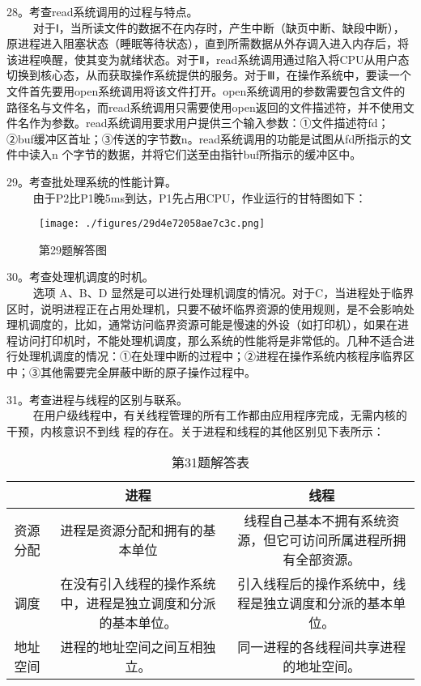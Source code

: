 28。考查read系统调用的过程与特点。\\
$\qquad$ 对于Ⅰ，当所读文件的数据不在内存时，产生中断（缺页中断、缺段中断），原进程进入阻塞状态（睡眠等待状态），直到所需数据从外存调入进入内存后，将该进程唤醒，使其变为就绪状态。对于Ⅱ，read系统调用通过陷入将CPU从用户态切换到核心态，从而获取操作系统提供的服务。对于Ⅲ，在操作系统中，要读一个文件首先要用open系统调用将该文件打开。open系统调用的参数需要包含文件的路径名与文件名，而read系统调用只需要使用open返回的文件描述符，并不使用文件名作为参数。read系统调用要求用户提供三个输入参数：①文件描述符fd；②buf缓冲区首址；③传送的字节数n。read系统调用的功能是试图从fd所指示的文件中读入n 个字节的数据，并将它们送至由指针buf所指示的缓冲区中。

29。考查批处理系统的性能计算。\\
$\qquad$ 由于P2比P1晚5ms到达，P1先占用CPU，作业运行的甘特图如下：
\begin{figure}[ht]
\centering
\texttt{[image: ./figures/29d4e72058ae7c3c.png]}
\caption{第29题解答图} \label{fig_CSN12_15}
\end{figure}

30。考查处理机调度的时机。\\
$\qquad$ 选项 A、B、D 显然是可以进行处理机调度的情况。对于C，当进程处于临界区时，说明进程正在占用处理机，只要不破坏临界资源的使用规则，是不会影响处理机调度的，比如，通常访问临界资源可能是慢速的外设（如打印机），如果在进程访问打印机时，不能处理机调度，那么系统的性能将是非常低的。几种不适合进行处理机调度的情况：①在处理中断的过程中；②进程在操作系统内核程序临界区中；③其他需要完全屏蔽中断的原子操作过程中。

31。考查进程与线程的区别与联系。\\
$\qquad$ 在用户级线程中，有关线程管理的所有工作都由应用程序完成，无需内核的干预，内核意识不到线
程的存在。关于进程和线程的其他区别见下表所示：
\begin{table}[ht]
\centering
\caption{第31题解答表}\label{tab_CSN12_7}
\begin{tabular}{|c|c|c|}
\hline
 & 进程 & 线程 \\
\hline
资源分配 & 进程是资源分配和拥有的基本单位 & 线程自己基本不拥有系统资源，但它可访问所属进程所拥有全部资源。 \\
\hline
调度 & 在没有引入线程的操作系统中，进程是独立调度和分派的基本单位。 & 引入线程后的操作系统中，线程是独立调度和分派的基本单位。 \\
\hline
地址空间 & 进程的地址空间之间互相独立。 & 同一进程的各线程间共享进程的地址空间。 \\
\hline
\end{tabular}
\end{table}

